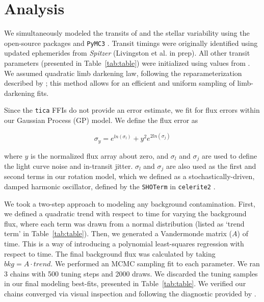 \documentclass[twocolumn]{aastex631}
\begin{document}
\section{Analysis} \label{sec:analysis}

We simultaneously modeled the transits of \allplanets and the stellar variability using the open-source packages \exoplanet \citep{exoplanet2019, exoplanet2021} and \texttt{PyMC3} \citep{Salvatier16}. Transit timings were originally identified using updated ephemerides from \textit{Spitzer} (Livingston et al. in prep). All other transit parameters (presented in Table~\ref{tab:table}) were initialized using values from \cite{David2019a}. We assumed quadratic limb darkening law, following the reparameterization described by \cite{kipping13}; this method allows for an efficient and uniform sampling of limb-darkening fits.


Since the \texttt{tica} FFIs do not provide an error estimate, we fit for flux errors within our Gaussian Process (GP) model. We define the flux error as

\begin{equation}
    \sigma_y = e^{ln(\sigma_l)} + y^2 e^{2 ln(\sigma_j)}
\end{equation}

where $y$ is the normalized flux array about zero, and $\sigma_l$  and $\sigma_j$ are used to define the light curve noise and in-transit jitter. $\sigma_l$  and $\sigma_j$ are also used as the first and second terms in our rotation model, which we defined as a stochastically-driven, damped harmonic oscillator, defined by the \texttt{SHOTerm} in \texttt{celerite2} \citep{dfm17}.

We took a two-step approach to modeling any background contamination. First, we defined a quadratic trend with respect to time for varying the background flux, where each term was drawn from a normal distribution (listed as `trend term' in Table~\ref{tab:table}). Then, we generated a Vandermonde matrix ($A$) of time. This is a way of introducing a polynomial least-squares regression with respect to time. The final background flux was calculated by taking $bkg = A \cdot trend$.  
We performed an MCMC sampling fit to each parameter. We ran 3 chains with 500 tuning steps and 2000 draws. We discarded the tuning samples in our final modeling best-fits, presented in Table~\ref{tab:table}. We verified our chains converged via visual inspection and following the diagnostic provided by \cite{Geweke92}.
\end{document}

